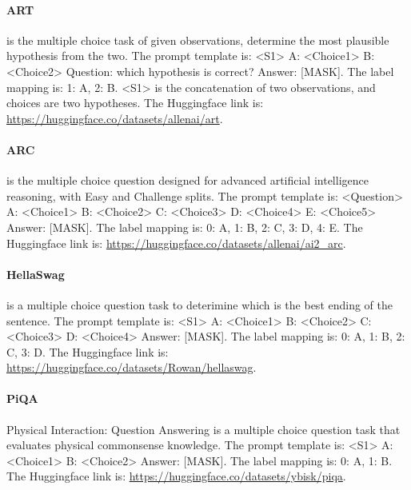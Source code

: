 \paragraph{ART} \citep{Bhagavatula2020Abductive} is the multiple choice task of given observations, determine the most plausible hypothesis from the two. The prompt template is: \textless{}S1\textgreater{} A: \textless{}Choice1\textgreater{} B: \textless{}Choice2\textgreater{} Question: which hypothesis is correct? Answer: {[}MASK{]}. The label mapping is: 1: A, 2: B. \textless{}S1\textgreater{} is the concatenation of two observations, and choices are two hypotheses. The Huggingface link is: \url{https://huggingface.co/datasets/allenai/art}.

\paragraph{ARC} \citep{allenai:arc} is the multiple choice question designed for advanced artificial intelligence reasoning, with Easy and Challenge splits. The prompt template is: \textless{}Question\textgreater{} A: \textless{}Choice1\textgreater{} B: \textless{}Choice2\textgreater{}
C: \textless{}Choice3\textgreater{}
D: \textless{}Choice4\textgreater{}
E: \textless{}Choice5\textgreater{} Answer: {[}MASK{]}. The label mapping is: 0: A, 1: B, 2: C, 3: D, 4: E. The Huggingface link is: \url{https://huggingface.co/datasets/allenai/ai2_arc}.

\paragraph{HellaSwag} \citep{zellers2019hellaswag} is a multiple choice question task to deterimine which is the best ending of the sentence. The prompt template is: \textless{}S1\textgreater{} A: \textless{}Choice1\textgreater{} B: \textless{}Choice2\textgreater{} C: \textless{}Choice3\textgreater{} D: \textless{}Choice4\textgreater{} Answer: {[}MASK{]}. The label mapping is: 0: A, 1: B, 2: C, 3: D. The Huggingface link is: \url{https://huggingface.co/datasets/Rowan/hellaswag}.

\paragraph{PiQA} Physical Interaction: Question Answering \citep{Bisk2020} is a multiple choice question task that evaluates physical commonsense knowledge. The prompt template is:  \textless{}S1\textgreater{} A: \textless{}Choice1\textgreater{} B: \textless{}Choice2\textgreater{} Answer: {[}MASK{]}. The label mapping is: 0: A, 1: B.  The Huggingface link is: \url{https://huggingface.co/datasets/ybisk/piqa}.

